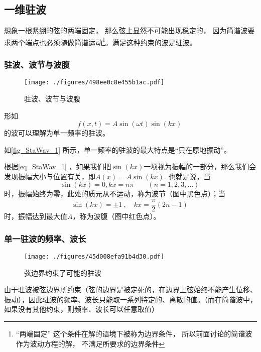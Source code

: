 
\begin{issues}
\issueDraft
\end{issues}


\subsection{一维驻波}
想象一根紧绷的弦的两端固定， 那么弦上显然不可能出现稳定的， 因为简谐波要求两个端点也必须随做简谐运动\footnote{“两端固定” 这个条件在解的语境下被称为边界条件， 所以前面讨论的简谐波作为波动方程的解， 不满足所要求的边界条件}。满足这种约束的波是驻波。

\subsubsection{驻波、波节与波腹}
\begin{figure}[ht]
\centering
\texttt{[image: ./figures/498ee0c8e455b1ac.pdf]}
\caption{驻波、波节与波腹} \label{fig_StaWav_1}
\end{figure}

形如
\begin{equation}\label{eq_StaWav_1}
f(x,t)=A\sin(\omega t)\sin(kx)~
\end{equation}
的波可以理解为单一频率的驻波。

如\autoref{fig_StaWav_1} 所示，单一频率的驻波的最大特点是“只在原地振动”。

根据\autoref{eq_StaWav_1} ，如果我们把$\sin(kx)$一项视为振幅的一部分，那么我们会发现振幅大小与位置有关，即$A(x) = A \sin(kx)$. 也就是说，当$$\sin(kx)=0, kx=n\pi \qquad (n=1,2,3,...)~$$时，振幅始终为零，此处的质元从不运动，称为波节（图中黑色点）；当$$\sin(kx)=\pm1~,\quad kx=\frac{\pi}{2} (2n-1)~$$时，振幅达到最大值$A$，称为波腹（图中红色点）。

\subsubsection{单一驻波的频率、波长}
\begin{figure}[ht]
\centering
\texttt{[image: ./figures/45d008efa91b4d30.pdf]}
\caption{弦边界约束了可能的驻波} \label{fig_StaWav_2}
\end{figure}

由于驻波被弦边界所约束（弦的边界是被定死的，在边界上弦始终不能产生位移、振动），因此驻波的频率、波长只能取一系列特定的、离散的值。（而在简谐波中，如果没有其他约束，则频率、波长可以任意取值）

